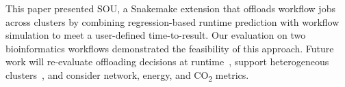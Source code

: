 This paper presented SOU, a Snakemake extension that offloads workflow jobs across clusters by combining regression-based runtime prediction with workflow simulation to meet a user-defined time-to-result. Our evaluation on two bioinformatics workflows demonstrated the feasibility of this approach. Future work will re-evaluate offloading decisions at runtime~\cite{da_silva_online_2015, hilman_task_2018}, support heterogeneous clusters~\cite{bader_lotaru_2024}, and consider network, energy, and CO\textsubscript{2} metrics.